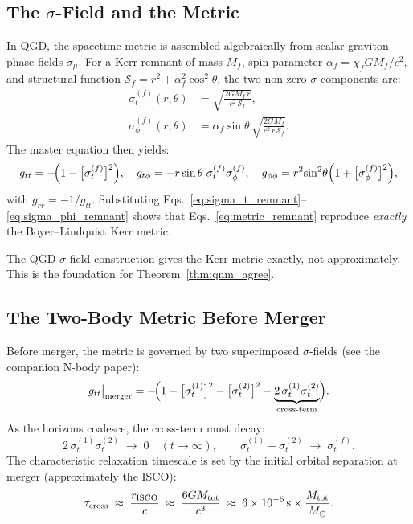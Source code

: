\documentclass[11pt,a4paper]{article}
\theoremstyle{definition}
\theoremstyle{remark}
\newcommand{\sig}[2]{\sigma_{#1}^{(#2)}}
\begin{document}
	\subsection{The $\sigma$-Field and the Metric}
	
	In QGD, the spacetime metric is assembled algebraically from scalar
	graviton phase fields $\sigma_\mu$.  For a Kerr remnant of mass $M_f$,
	spin parameter $\alpha_f = \chi_f GM_f/c^2$, and structural function
	$\mathcal{S}_f = r^2 + \alpha_f^2\cos^2\theta$, the two non-zero
	$\sigma$-components are:
	\begin{align}
		\sig{t}{f}(r,\theta)
		&= \sqrt{\frac{2GM_f\,r}{c^2\,\mathcal{S}_f}},
		\label{eq:sigma_t_remnant}\\[4pt]
		\sig{\phi}{f}(r,\theta)
		&= \alpha_f\sin\theta\,\sqrt{\frac{2GM_f}{c^2\,r\,\mathcal{S}_f}}.
		\label{eq:sigma_phi_remnant}
	\end{align}
	The master equation then yields:
	\begin{equation}
		g_{tt} = -\!\Bigl(1 - \bigl[\sig{t}{f}\bigr]^2\Bigr),\quad
		g_{t\phi} = -r\sin\theta\;\sig{t}{f}\sig{\phi}{f},\quad
		g_{\phi\phi} = r^2\!\sin^2\!\theta\Bigl(1+\bigl[\sig{\phi}{f}\bigr]^2\Bigr),
		\label{eq:metric_remnant}
	\end{equation}
	with $g_{rr} = -1/g_{tt}$.  Substituting
	Eqs.~\eqref{eq:sigma_t_remnant}--\eqref{eq:sigma_phi_remnant} shows
	that Eqs.~\eqref{eq:metric_remnant} reproduce \emph{exactly} the
	Boyer--Lindquist Kerr metric.
	
		The QGD $\sigma$-field construction gives the Kerr metric exactly,
		not approximately.  This is the foundation for Theorem~\ref{thm:qnm_agree}.
	
	\subsection{The Two-Body Metric Before Merger}
	
	Before merger, the metric is governed by two superimposed $\sigma$-fields
	(see the companion N-body paper):
	\begin{equation}
		g_{tt}\big|_{\rm merger}
		= -\!\Bigl(1
		- \bigl[\sig{t}{1}\bigr]^2
		- \bigl[\sig{t}{2}\bigr]^2
		- \underbrace{2\,\sig{t}{1}\sig{t}{2}}_{\textrm{cross-term}}
		\Bigr).
		\label{eq:gtt_premerger}
	\end{equation}
	As the horizons coalesce, the cross-term must decay:
	\begin{equation}
		2\,\sig{t}{1}\sig{t}{2}\;\longrightarrow\;0\quad(t\to\infty),
		\qquad
		\sig{t}{1}+\sig{t}{2}\;\longrightarrow\;\sig{t}{f}.
		\label{eq:sigma_relax}
	\end{equation}
	The characteristic relaxation timescale is set by the initial orbital
	separation at merger (approximately the ISCO):
	\begin{equation}
		\tau_{\rm cross}
		\;\approx\; \frac{r_{\rm ISCO}}{c}
		\;\approx\; \frac{6GM_{\rm tot}}{c^3}
		\;\approx\; 6\times10^{-5}\,{\rm s}\times\frac{M_{\rm tot}}{M_\odot}.
		\label{eq:tau_cross}
	\end{equation}
	
\end{document}
